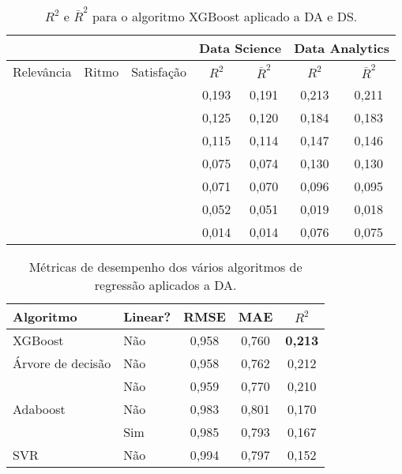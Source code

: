 \begin{table}
	\centering
	\caption{$R^2$ e $\bar R^2$ para o algoritmo XGBoost aplicado a DA e DS.}
	\label{tab:r2-adjusted}
	\begin{tabular}{ccccccc}
		\toprule
		           &            &            & \multicolumn{2}{c}{ Data Science  } & \multicolumn{2}{c}{ Data Analytics }\\
		\midrule
		Relevância & Ritmo      & Satisfação & $R^2$     & $\bar R^2$ & $R^2$     & $\bar R^2$\\
		\midrule
		\checkmark & \checkmark & \checkmark & 0,193 & 0,191 & 0,213 & 0,211 \\
		           & \checkmark & \checkmark & 0,125 & 0,120 & 0,184 & 0,183 \\
		\checkmark &            & \checkmark & 0,115 & 0,114 & 0,147 & 0,146 \\
		           &            & \checkmark & 0,075 & 0,074 & 0,130 & 0,130 \\
		\checkmark & \checkmark &            & 0,071 & 0,070 & 0,096 & 0,095 \\
		\checkmark &            &            & 0,052 & 0,051 & 0,019 & 0,018 \\
		           & \checkmark &            & 0,014 & 0,014 & 0,076 & 0,075 \\
		\bottomrule
	\end{tabular}
\end{table}

\begin{table}[b]
	\centering
	\caption{Métricas de desempenho dos vários algoritmos de regressão aplicados a DA.}
	\label{tab:reg-da-1}
	\begin{tabular}{llccc}
		\toprule
		Algoritmo               & Linear? & RMSE  &   MAE & $R^2$\\
		\midrule
		XGBoost                 & Não     & 0,958 & 0,760 & \textbf{0,213}\\
		Árvore de decisão       & Não     & 0,958 & 0,762 & 0,212\\
		\foreign{Random Forest} & Não     & 0,959 & 0,770 & 0,210\\
		Adaboost                & Não     & 0,983 & 0,801 & 0,170\\
		\foreign{ElasticNet}    & Sim     & 0,985 & 0,793 & 0,167\\
		SVR                     & Não     & 0,994 & 0,797 & 0,152\\
		\bottomrule
	\end{tabular}
\end{table}

